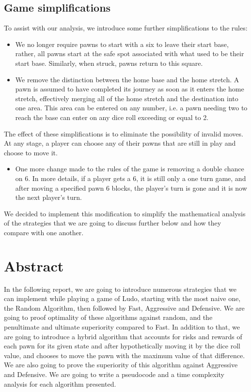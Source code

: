 \documentclass{article} %
\begin{document}
\subsection{Game simplifications}
To assist with our analysis, we introduce some further simplifications to the rules: 

\begin{itemize}


\item We no longer require pawns to start with a six to leave their start base, rather, all pawns start at the safe spot associated with what used to be their start base. Similarly, when struck, pawns return to this square.
\item We remove the distinction between the home base and the home stretch. A pawn is assumed to have completed its journey as soon as it enters the home stretch, effectively merging all of the home stretch and the destination into one area. This area can be entered on any number, i.e. a pawn needing two to reach the base can enter on any dice roll exceeding or equal to 2.
\end{itemize}

    The effect of these simplifications is to eliminate the possibility of invalid moves. At any stage, a player can choose any of their pawns that are still in play and choose to move it.

\begin{itemize}
\item One more change made to the rules of the game is removing a double chance on 6. In more details, if a player gets a 6, it is still only a one turn game, and after moving a specified pawn 6 blocks, the player’s turn is gone and it is now the next player’s turn. 
\end{itemize}

We decided to implement this modification to simplify the mathematical analysis of the strategies that we are going to discuss further below and how they compare with one another. 

\section{Abstract}
In the following report, we are going to introduce numerous strategies that we can 
	implement while playing a game of Ludo, starting with the most naive one, the 
Random Algorithm, then followed by Fast, Aggressive and Defensive. We are going to proof optimality of these algorithms against random, and the penultimate and ultimate
superiority compared to Fast. In addition to that, we are going to introduce a hybrid
algorithm that accounts for risks and rewards of each pawn for its given state and after hypothetically moving it by the dice roll value, and chooses to move the pawn with the maximum value of that difference. We are also going to prove the superiority of this algorithm against Aggressive and Defensive. We are going to write a pseudocode and a time complexity analysis for each algorithm presented.
\end{document}
